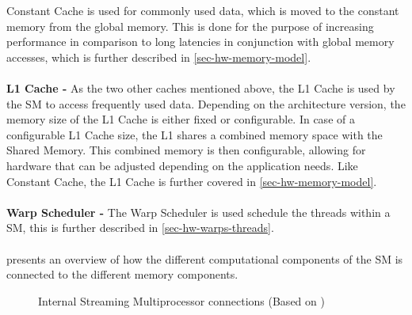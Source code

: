 Constant Cache is used for commonly used data, which is moved to the constant memory from the global memory.
This is done for the purpose of increasing performance in comparison to long latencies in conjunction with global memory accesses, which is further described in \cref{sec-hw-memory-model}.
\\\\	
\textbf{L1 Cache -} As the two other caches mentioned above, the L1 Cache is used by the SM to access frequently used data. 
Depending on the architecture version, the memory size of the L1 Cache is either fixed or configurable.
In case of a configurable L1 Cache size, the L1 shares a combined memory space with the Shared Memory.
This combined memory is then configurable, allowing for hardware that can be adjusted depending on the application needs. Like Constant Cache, the L1 Cache is further covered in \cref{sec-hw-memory-model}.
\\\\
\textbf{Warp Scheduler -} The Warp Scheduler is used schedule the threads within a SM, this is further described in \cref{sec-hw-warps-threads}.
\\\\	
 presents an overview of how the different computational components of the SM is connected to the different memory components.

\begin{figure}[H]
	\centering
	\caption{Internal Streaming Multiprocessor connections (Based on \cite{Cook2008})}
	\label{fig:hw-sm-inside}
\end{figure}